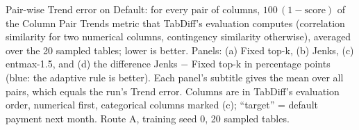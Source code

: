 Pair-wise Trend error on Default: for every pair of columns, $100\,(1-\text{score})$ of the Column Pair Trends metric that TabDiff's evaluation computes (correlation similarity for two numerical columns, contingency similarity otherwise), averaged over the 20 sampled tables; lower is better. Panels: (a) Fixed top-k, (b) Jenks, (c) entmax-1.5, and (d) the difference Jenks $-$ Fixed top-k in percentage points (blue: the adaptive rule is better). Each panel's subtitle gives the mean over all pairs, which equals the run's Trend error. Columns are in TabDiff's evaluation order, numerical first, categorical columns marked (c); ``target'' = default payment next month. Route A, training seed 0, 20 sampled tables.
